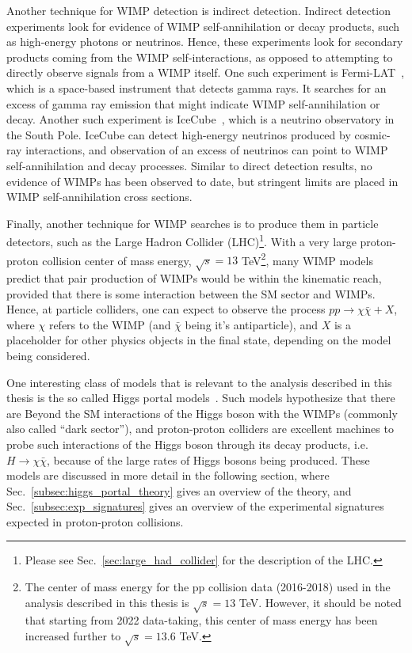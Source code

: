 Another technique for WIMP detection is indirect detection. Indirect detection experiments look 
for evidence of WIMP self-annihilation or decay products,
such as high-energy photons or neutrinos. Hence, these experiments look for secondary products coming from the WIMP
self-interactions, as opposed to attempting to directly observe signals from a WIMP itself. One such experiment is
Fermi-LAT~\cite{Fermi-LAT:2011vow}, which is a space-based instrument that detects gamma rays. It searches for an excess
of gamma ray emission that might indicate WIMP self-annihilation or decay. Another such experiment is IceCube~\cite{Iovine:2022aiw},
which is a neutrino observatory in the South Pole. IceCube can detect high-energy neutrinos produced by cosmic-ray interactions,
and observation of an excess of neutrinos can point to WIMP self-annihilation and decay processes. Similar to direct detection results,
no evidence of WIMPs has been observed to date, but stringent limits are placed in WIMP self-annihilation cross sections. 

Finally, another technique for WIMP searches is to produce them in particle detectors, such as the Large Hadron Collider 
(LHC)\footnote{Please see Sec.~\ref{sec:large_had_collider} for the description of the LHC.}. 
With a very large proton-proton collision
center of mass energy, $\sqrt{s} = 13$ TeV\footnote{The center of mass energy for the pp collision data (2016-2018) 
used in the analysis described in this thesis is $\sqrt{s} = 13$ TeV. 
However, it should be noted that starting from 2022 data-taking, this center of mass
energy has been increased further to $\sqrt{s} = 13.6$ TeV.}, many WIMP models predict that pair production of WIMPs would be
within the kinematic reach, provided that there is some interaction between the SM sector and WIMPs. Hence, at particle colliders,
one can expect to observe the process $pp \rightarrow \chi \bar{\chi} + X$, where $\chi$ refers to the WIMP (and $\bar{\chi}$ being
it's antiparticle), and $X$ is a placeholder for other physics objects in the final state, depending on the model being considered.

One interesting class of models that is relevant to the analysis described in this thesis is the so called Higgs portal models~\cite{Argyropoulos:2021sav}.
Such models hypothesize that there are Beyond the SM interactions of the Higgs boson with the WIMPs (commonly also called ``dark sector''),
and proton-proton colliders are excellent machines to probe such interactions of the Higgs boson through its decay products, i.e. 
$H \rightarrow \chi \bar{\chi}$, because of the large rates of Higgs bosons being produced. These models are discussed in more detail in the
following section, where Sec.~\ref{subsec:higgs_portal_theory} gives an overview of the theory, and Sec.~\ref{subsec:exp_signatures} gives an overview
of the experimental signatures expected in proton-proton collisions.  




